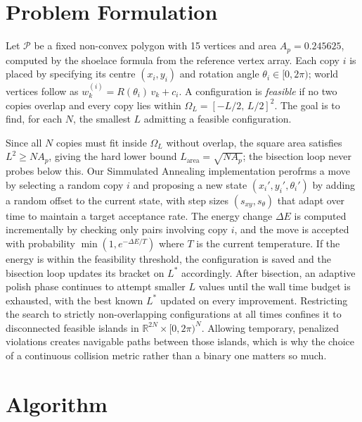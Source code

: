 \documentclass[10pt]{article}
\begin{document}
\section{Problem Formulation}
\label{sec:formulation}

Let $\mathcal{P}$ be a fixed non-convex polygon with 15 vertices and
area $A_p = 0.245625$, computed by the shoelace formula from the
reference vertex array. Each copy $i$ is placed by specifying its
centre $(x_i, y_i)$ and rotation angle $\theta_i \in [0, 2\pi)$;
world vertices follow as $w_k^{(i)} = R(\theta_i)\,v_k + c_i$. A
configuration is \emph{feasible} if no two copies overlap and every
copy lies within $\Omega_L = [-L/2,\,L/2]^2$. The goal is to find,
for each $N$, the smallest $L$ admitting a feasible configuration.

Since all $N$ copies must fit inside $\Omega_L$ without overlap, the
square area satisfies $L^2 \geq N A_p$, giving the hard lower bound
$L_{\mathrm{area}} = \sqrt{N A_p}$; the bisection loop never probes
below this. Our Simmulated Annealing implementation
perofrms a move by selecting a random copy $i$ and proposing a new state
$(x_i', y_i', \theta_i')$ by adding a random offset to the current state,
 with step sizes $(s_{xy}, s_\theta)$ that adapt over time to
  maintain a target acceptance rate.
   The energy change $\Delta E$ is computed incrementally by 
   checking only pairs involving copy $i$, and the move 
   is accepted with probability $\min(1, e^{-\Delta E/T})$ where $T$ is
    the current temperature. If the energy is within the 
feasibility threshold, the configuration is saved
and the bisection loop updates its bracket on $L^*$ accordingly. After
bisection, an adaptive polish phase continues to attempt smaller $L$ values until the wall time budget is exhausted, with the best known $L^*$ updated on every improvement.
 Restricting the search to strictly non-overlapping
configurations at all times confines it to disconnected feasible
islands in $\mathbb{R}^{2N} \times [0, 2\pi)^N$. Allowing temporary,
penalized violations creates navigable paths between those islands,
which is why the choice of a continuous collision metric rather than a
binary one matters so much.

\section{Algorithm}
\label{sec:algorithm}
\end{document}
